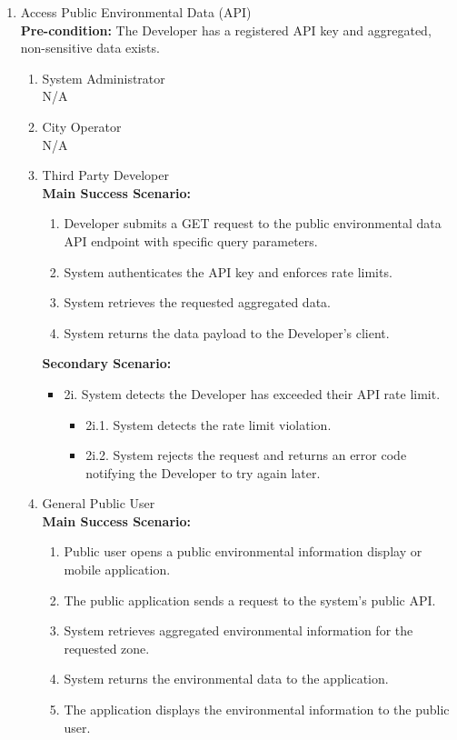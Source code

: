 {\begin{enumerate}[{\bf BE1.}]
	\item Access Public Environmental Data (API) \\
    {\bf Pre-condition:} The Developer has a registered API key and aggregated, non-sensitive data exists.
    \begin{enumerate}[{\bf VP1.}]
        \item System Administrator \\ N/A
        \item City Operator \\ N/A
        \item {Third Party Developer} \\
            {\bf Main Success Scenario:}
                \begin{enumerate}[1. ]
                    \item Developer submits a GET request to the public environmental data API endpoint with specific query parameters.
                    \item System authenticates the API key and enforces rate limits.
                    \item System retrieves the requested aggregated data.
                    \item System returns the data payload to the Developer's client.
                \end{enumerate}

            {\bf Secondary Scenario:}
            \begin{itemize}
                \item[] {2i.} System detects the Developer has exceeded their API rate limit.
                \begin{itemize}
                    \item[] {2i.1.} System detects the rate limit violation.
                    \item[] {2i.2.} System rejects the request and returns an error code notifying the Developer to try again later.
                \end{itemize}
            \end{itemize}
        \item General Public User \\
        {\bf Main Success Scenario:}
            \begin{enumerate}[1. ]
                \item Public user opens a public environmental information display or mobile application.
                \item The public application sends a request to the system’s public API.
                \item System retrieves aggregated environmental information for the requested zone.
                \item System returns the environmental data to the application.
                \item The application displays the environmental information to the public user.
            \end{enumerate}


\end{enumerate}
\end{enumerate}}

